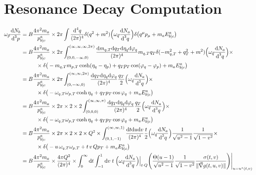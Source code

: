\section{Resonance Decay Computation}
\label{sec:Apdx_ResonanceComput}

\begin{subequations}
    \begin{align}
        \omega_{\vec{p}}\frac{\text{d} N_b}{\text{d}^3p}&=B\frac{4\pi^2m_a}{p^a_{b\vert c}}\times2\pi\int\frac{\text{d}^4q}{(2\pi)^4}\delta(q^2+m^2)\Big(\omega_{\vec{q}}\frac{\text{d} N_a}{\text{d}^3 q}\Big)\delta\big(q^\mu p_\mu+m_a E^a_{b\vert c}\big)\\
        &=B\frac{4\pi^2m_a}{p^a_{b\vert c}}\times2\pi\int_{(0,0,-\infty,0)}^{(\infty,\infty,\infty,2\pi)}\frac{\text{d} m_{q,T} \text{d} q_T\text{d}\eta_q\text{d}\varphi_q}{(2\pi)^4}m_{q,T} q_T\delta(-m_{q,T}^2+q_T^2+m^2)\Big(\omega_{\vec{q}}\frac{\text{d} N_a}{\text{d}^3 q}\Big)\times\nonumber\\
        &\phantom{=}\qquad\times\delta\big(-m_{q,T} m_{p,T}\cosh(\eta_q-\eta_p)+q_Tp_T\cos(\varphi_q-\varphi_p)+m_a E^a_{b\vert c}\big)\\
        &=B\frac{4\pi^2m_a}{p^a_{b\vert c}}\times2\pi\int_{(0,-\infty,0)}^{(\infty,\infty,2\pi)}\frac{\text{d} q_T\text{d}\eta_q\text{d}\varphi_q}{(2\pi)^4}\frac{q_T}{2}\Big(\omega_{\vec{q}}\frac{\text{d} N_a}{\text{d}^3 q}\Big)\times\nonumber\\
        &\phantom{=}\qquad\times\delta\big(-\omega_{q,T} \omega_{p,T}\cosh\eta_q+q_Tp_T\cos\varphi_q+m_a E^a_{b\vert c}\big)\\
        &=B\frac{4\pi^2m_a}{p^a_{b\vert c}}\times2\pi\times 2\times 2\int_{(0,0,0)}^{(\infty,\infty,\pi)}\frac{\text{d} q_T\text{d}\eta_q\text{d}\varphi_q}{(2\pi)^4}\frac{q_T}{2}\Big(\omega_{\vec{q}}\frac{\text{d} N_a}{\text{d}^3 q}\Big)\times\nonumber\\
        &\phantom{=}\qquad\times\delta\big(-\omega_{q,T} \omega_{p,T}\cosh\eta_q+q_Tp_T\cos\varphi_q+m_a E^a_{b\vert c}\big)\\
        &=B\frac{4\pi^2m_a}{p^a_{b\vert c}}\times2\pi\times 2\times 2\times Q^2\times\int_{(0,1,-1)}^{(\infty,\infty,1)}\frac{\text{d} t\text{d} u\text{d} v}{(2\pi)^4}\frac{t}{2}\Big(\omega_{\vec{q}}\frac{\text{d} N_a}{\text{d}^3 q}\Big)\frac{1}{\sqrt{u^2-1}}\frac{1}{\sqrt{1-v^2}}\times\nonumber\\
        &\phantom{=}\qquad\times\delta\big(-u\,\omega_{q,T} \omega_{p,T}+t\,v\,Q p_T+m_a E^a_{b\vert c}\big)\\
        &=B\frac{4\pi^2m_a}{p^a_{b\vert c}}\times\frac{4\pi Q^2}{(2\pi)^4}\times\int_0^\infty\text{d} t\int_{-1}^1\text{d} v\;t\;\Big(\omega_{\vec{q}}\frac{\text{d} N_a}{\text{d}^3 q}\Big)\Big\vert_{t\cdot Q }\Bigg(\frac{\Theta(u-1)}{\sqrt{u^2-1}}\frac{1}{\sqrt{1-v^2}}\frac{\sigma(t,v)}{\Vert\vec{\nabla}g(t,u,v)\Vert}\Bigg)\Bigg\vert_{u=u^\star(t,v)}        
    \end{align}
\end{subequations}

